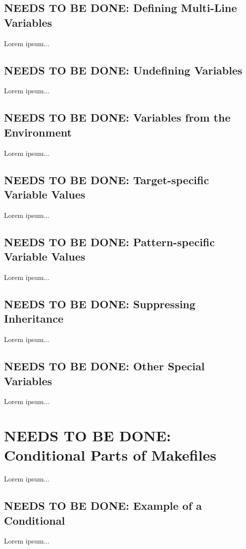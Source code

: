 \documentclass{charun}
\begin{document}
\begin{multicols*}{2}
\color{gray}
\subsection{NEEDS TO BE DONE: Defining Multi-Line Variables}
Lorem ipsum...
\color{black}

\color{gray}
\subsection{NEEDS TO BE DONE: Undefining Variables}
Lorem ipsum...
\color{black}

\color{gray}
\subsection{NEEDS TO BE DONE: Variables from the Environment}
Lorem ipsum...
\color{black}

\color{gray}
\subsection{NEEDS TO BE DONE: Target-specific Variable Values}
Lorem ipsum...
\color{black}

\color{gray}
\subsection{NEEDS TO BE DONE: Pattern-specific Variable Values}
Lorem ipsum...
\color{black}

\color{gray}
\subsection{NEEDS TO BE DONE: Suppressing Inheritance}
Lorem ipsum...
\color{black}

\color{gray}
\subsection{NEEDS TO BE DONE: Other Special Variables}
Lorem ipsum...
\color{black}


\color{gray}
\section{NEEDS TO BE DONE: Conditional Parts of Makefiles}
Lorem ipsum...
\color{black}


\color{gray}
\subsection{NEEDS TO BE DONE: Example of a Conditional}
Lorem ipsum...
\color{black}


\end{multicols*}
\end{document}
